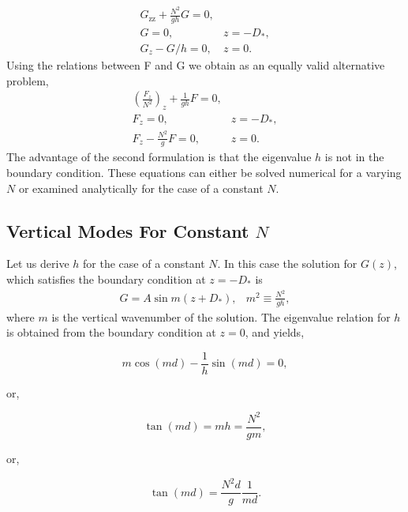 \documentclass[11pt]{article}
\begin{document}
\begin{equation*}
\begin{array}{cc}
G_\textrm{zz}+\frac{N^2}{g h} G = 0, \\
G = 0,& z = -D_*, \\
G_z-G/h=0,& z = 0.
\end{array}
\end{equation*}
Using the relations between F and G we obtain as an equally valid alternative problem,
\begin{equation*}
\begin{array}{cc}
\left(\frac{F_z}{N^2}\right)_z+\frac{1}{g h} F = 0, \\
F_z = 0,& z = -D_*, \\
F_z-\frac{N^2}{g}F=0,& z = 0.
\end{array}
\end{equation*}
The advantage of the second formulation is that the eigenvalue $h$ is not in the boundary condition. These equations can either be solved numerical for a varying $N$ or examined analytically for the case of a constant $N$.


\subsection{Vertical Modes For Constant $N$}

Let us derive $h$ for the case of a constant $N$. In this case the solution for $G(z)$, which satisfies the boundary condition at $z=-D_*$ is
\begin{equation*}
\begin{array}{cc}
G=A\sin m(z+D_*),& m^2\equiv\frac{N^2}{g h},
\end{array}
\end{equation*}
where $m$ is the vertical wavenumber of the solution. The eigenvalue relation for $h$ is obtained from the boundary condition at $z=0$, and yields,

\begin{equation*}
m \cos (m d)-\frac{1}{h}\sin(m d)=0,
\end{equation*}

or,

\begin{equation*}
\tan (m d) = m h = \frac{N^2}{g m},
\end{equation*}

or,

\begin{equation*}
\tan (m d) = \frac{N^2 d}{g}\frac{1}{m d}.
\end{equation*}
\end{document}
